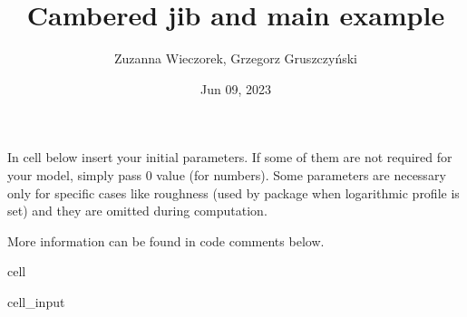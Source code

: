 \documentclass[a4paper,12pt,english]{jupyterBook}
\title{Cambered jib and main example}
\date{Jun 09, 2023}
\author{Zuzanna Wieczorek, Grzegorz Gruszczyński}
\begin{document}
\pagestyle{empty}
\sphinxmaketitle
\clearpage

\pagestyle{plain}
\sphinxtableofcontents
\pagestyle{normal}
\label{\detokenize{chapters/examples/sailingvlm_example::doc}}


\sphinxAtStartPar
In cell below insert your initial parameters. If some of them are not required for your model, simply pass 0 value (for numbers).
Some parameters are necessary only for specific cases like roughness (used by package when logarithmic profile is set) and they are omitted during computation.



\sphinxAtStartPar
More information can be found in code comments below.

\begin{sphinxuseclass}{cell}\begin{sphinxVerbatimInput}

\begin{sphinxuseclass}{cell_input}
\begin{sphinxVerbatim}[commandchars=\\\{\}]
 
   
 

   \PYG{p}{[}      \PYG{p}{]}
  \PYG{p}{[}    \PYG{p}{]}


\end{sphinxVerbatim}
\end{sphinxuseclass}
\end{sphinxVerbatimInput}
\end{sphinxuseclass}
\end{document}
